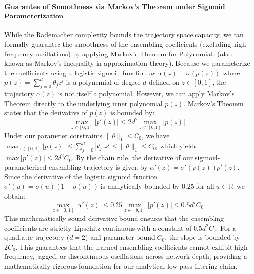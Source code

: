 \paragraph{Guarantee of Smoothness via Markov's Theorem under Sigmoid Parameterization}
While the Rademacher complexity bounds the trajectory space capacity, we can formally guarantee the smoothness of the ensembling coefficients (excluding high-frequency oscillations) by applying Markov's Theorem for Polynomials (also known as Markov's Inequality in approximation theory). Because we parameterize the coefficients using a logistic sigmoid function as $\alpha(z) = \sigma(p(z))$ where $p(z) = \sum_{j=0}^d \theta_j z^j$ is a polynomial of degree $d$ defined on $z \in [0, 1]$, the trajectory $\alpha(z)$ is not itself a polynomial. However, we can apply Markov's Theorem directly to the underlying inner polynomial $p(z)$. 
Markov's Theorem states that the derivative of $p(z)$ is bounded by:
\begin{equation}
\max_{z \in [0, 1]} |p'(z)| \le 2 d^2 \max_{z \in [0, 1]} |p(z)|
\end{equation}
Under our parameter constraints $\|\theta\|_1 \le C_0$, we have $\max_{z \in [0, 1]} |p(z)| \le \sum_{j=0}^d |\theta_j| z^j \le \|\theta\|_1 \le C_0$, which yields $\max |p'(z)| \le 2 d^2 C_0$. By the chain rule, the derivative of our sigmoid-parameterized ensembling trajectory is given by $\alpha'(z) = \sigma'(p(z)) p'(z)$. Since the derivative of the logistic sigmoid function $\sigma'(u) = \sigma(u)(1-\sigma(u))$ is analytically bounded by $0.25$ for all $u \in \mathbb{R}$, we obtain:
\begin{equation}
\label{eq:smoothness_sigmoid_bound}
\max_{z \in [0, 1]} |\alpha'(z)| \le 0.25 \max_{z \in [0, 1]} |p'(z)| \le 0.5 d^2 C_0
\end{equation}
This mathematically sound derivative bound ensures that the ensembling coefficients are strictly Lipschitz continuous with a constant of $0.5 d^2 C_0$. For a quadratic trajectory ($d=2$) and parameter bound $C_0$, the slope is bounded by $2 C_0$. This guarantees that the learned ensembling coefficients cannot exhibit high-frequency, jagged, or discontinuous oscillations across network depth, providing a mathematically rigorous foundation for our analytical low-pass filtering claim.

